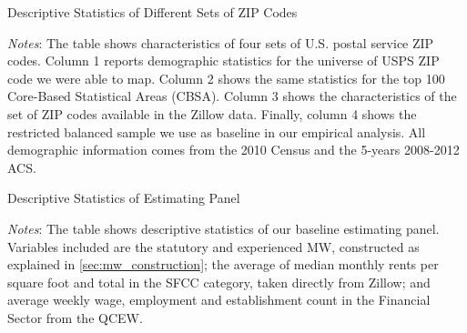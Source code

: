 
\begin{table}[h!]
    \caption{Descriptive Statistics of Different Sets of ZIP Codes}
    \centering
    \label{tab:desc_stats}    
    
    \begin{minipage}{0.95\textwidth} \footnotesize
        \vspace{3mm} 
        \textit{Notes}: The table shows characteristics of four sets of U.S. postal service 
        ZIP codes. Column 1 reports demographic statistics for the universe of USPS ZIP code 
        we were able to map. Column 2 shows the same statistics for the top 100 Core-Based 
        Statistical Areas (CBSA). Column 3 shows the characteristics of the set of ZIP codes 
        available in the Zillow data. Finally, column 4 shows the restricted balanced sample 
        we use as baseline in our empirical analysis. All demographic information comes from 
        the 2010 Census and the 5-years 2008-2012 ACS.
    \end{minipage}
\end{table}

\clearpage
\begin{table}[h!]
    \caption{Descriptive Statistics of Estimating Panel}
    \centering
    \label{tab:estimating_panel_stats}    
    
    \begin{minipage}{0.95\textwidth} \footnotesize
        \vspace{3mm} 
        \textit{Notes}: The table shows descriptive statistics of our baseline estimating panel.
        Variables included are the statutory and experienced MW, constructed as explained in
        \autoref{sec:mw_construction}; the average of median monthly rents per square foot and 
        total in the SFCC category, taken directly from Zillow; and average weekly wage, employment 
        and establishment count in the Financial Sector from the QCEW.
    \end{minipage}
\end{table}
